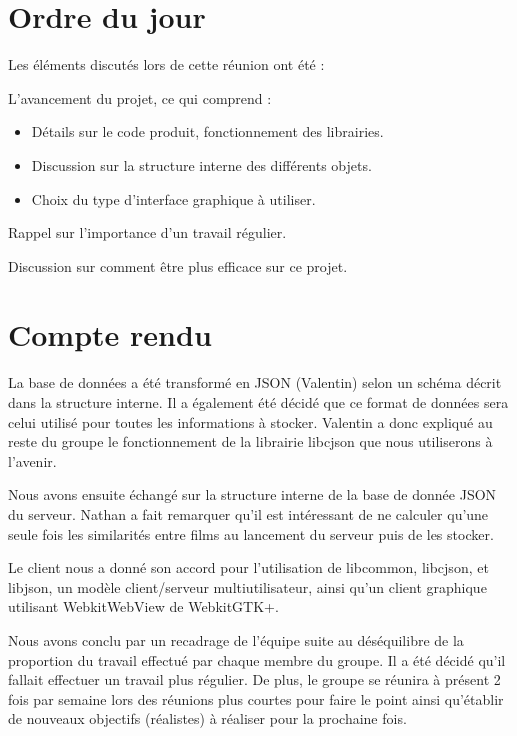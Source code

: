 \documentclass[11pt]{meetingmins}
\begin{document}
\maketitle

\section{Ordre du jour}
Les éléments discutés lors de cette réunion ont été :
\begin{hiddenitems}
	\item L'avancement du projet, ce qui comprend :
	\begin{itemize}
		\item Détails sur le code produit, fonctionnement des librairies.
		\item Discussion sur la structure interne des différents objets.
		\item Choix du type d'interface graphique à utiliser.
	\end{itemize}
	\item Rappel sur l'importance d'un travail régulier.
	\item Discussion sur comment être plus efficace sur ce projet.
\end{hiddenitems}

\section {Compte rendu}
	La base de données a été transformé en JSON (Valentin) selon un schéma décrit dans la structure interne.
	Il a également été décidé que ce format de données sera celui utilisé pour toutes les informations à stocker. Valentin a donc expliqué au reste du groupe le fonctionnement de la librairie libcjson que nous utiliserons à l'avenir.\par
	Nous avons ensuite échangé sur la structure interne de la base de donnée JSON du serveur.
	Nathan a fait remarquer qu'il est intéressant de ne calculer qu'une seule fois les similarités entre films au lancement du serveur puis de les stocker.\par
	Le client nous a donné son accord pour l'utilisation de libcommon, libcjson, et libjson, un modèle client/serveur multiutilisateur, ainsi qu'un client graphique utilisant WebkitWebView de WebkitGTK+.\par
	Nous avons conclu par un recadrage de l'équipe suite au déséquilibre de la proportion du travail effectué par chaque membre du groupe. Il a été décidé qu'il fallait effectuer un travail plus régulier. De plus, le groupe se réunira à présent 2 fois par semaine lors des réunions plus courtes pour faire le point ainsi qu'établir de nouveaux objectifs (réalistes) à réaliser pour la prochaine fois.
\end{document}
